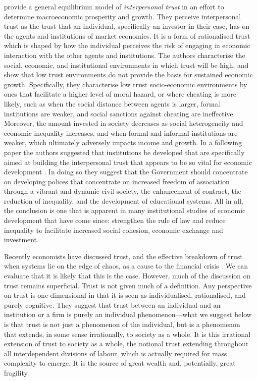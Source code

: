 \begin{subappendices}
\citet{ZakKnack2001} provide a general equilibrium model of \textit{interpersonal trust} in an effort to determine macroeconomic prosperity and growth. They perceive interpersonal trust as the trust that an individual, specifically an investor in their case, has on the agents and institutions of market economies. It is a form of rationalised trust which is shaped by how the individual perceives the risk of engaging in economic interaction with the other agents and institutions. The authors characterise the social, economic, and institutional environments in which trust will be high, and show that low trust environments do not provide the basis for sustained economic growth. Specifically, they characterise low trust socio-economic environments by ones that facilitate a higher level of  moral hazard, or where cheating is more likely, such as when the social distance between agents is larger, formal institutions are weaker, and social sanctions against cheating are ineffective. Moreover, the amount invested in society decreases as social heterogeneity and economic inequality increases, and when formal and informal institutions are weaker, which ultimately adversely impacts income and growth. In a following paper the authors suggested that institutions be developed that are specifically aimed at building the interpersonal trust that appears to be so vital for economic development \citep{KnackZak2003}. In doing so they suggest that the Government should concentrate on developing polices that concentrate on increased freedom of association through a vibrant and dynamic civil society, the enhancement of contract, the reduction of inequality, and the development of educational systems. All in all, the conclusion is one that is apparent in many institutional studies of economic development that have come since: strengthen the rule of law and reduce inequality to facilitate increased social cohesion, economic exchange and investment.

Recently economists have discussed trust, and the effective breakdown of trust when systems lie on the edge of chaos, as a cause to the financial crisis \citep{Shiller2008, Tonkiss2009}. We can evaluate that it is likely that this is the case. However, much of the discussion on trust remains superficial. Trust is not given much of a definition. Any perspective on trust is one-dimensional in that it is seen as individualised, rationalised, and purely cognitive. They suggest that trust between an individual and an institution or a firm is purely an individual phenomenon---what we suggest below is that trust is not just a phenomenon of the individual, but is a phenomenon that extends, in some sense irrationally, to society as a whole. It is this irrational extension of trust to society as a whole, the notional trust extending throughout all interdependent divisions of labour, which is actually required for mass complexity to emerge. It is the source of great wealth and, potentially, great fragility.


\end{subappendices}
